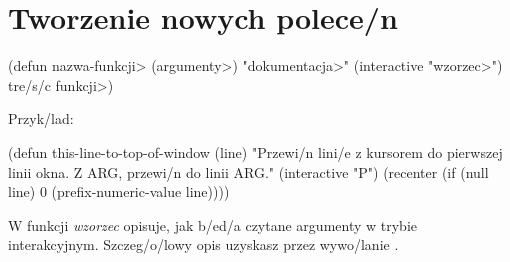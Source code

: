 \section{Tworzenie nowych polece/n}

\beginexample%
(defun \<nazwa-funkcji> (\<argumenty>)
  "\<dokumentacja>"
  (interactive "\<wzorzec>")
  \<tre/s/c funkcji>)
\endexample

Przyk/lad:

\beginexample%
(defun this-line-to-top-of-window (line)
  "Przewi/n lini/e z kursorem do pierwszej linii okna.
Z ARG, przewi/n do linii ARG."
  (interactive "P")
  (recenter (if (null line)
                0
              (prefix-numeric-value line))))
\endexample

W funkcji  {\it wzorzec\/} opisuje, jak b/ed/a czytane
argumenty w trybie interakcyjnym. Szczeg/o/lowy opis uzyskasz
przez wywo/lanie .

\copyrightnotice

\bye


